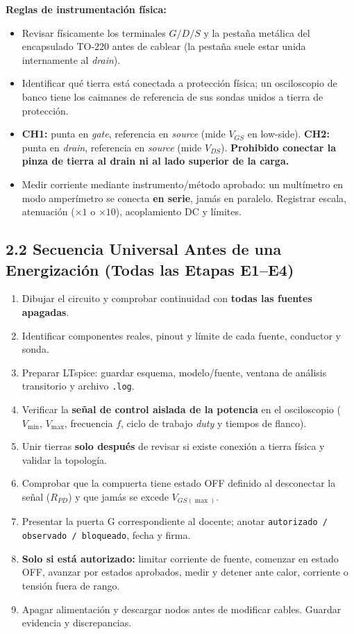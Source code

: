 \documentclass[10pt, a4paper, landscape]{article}
\begin{document}
\noindent
\textbf{Reglas de instrumentación física:}
\begin{itemize}[noitemsep, topsep=2pt]
    \item Revisar físicamente los terminales $G/D/S$ y la pestaña metálica del encapsulado TO-220 antes de cablear (la pestaña suele estar unida internamente al \textit{drain}).
    \item Identificar qué tierra está conectada a protección física; un osciloscopio de banco tiene los caimanes de referencia de sus sondas unidos a tierra de protección.
    \item \textbf{CH1:} punta en \textit{gate}, referencia en \textit{source} (mide $V_{GS}$ en low-side). \textbf{CH2:} punta en \textit{drain}, referencia en \textit{source} (mide $V_{DS}$). \textbf{\textcolor{warnred}{Prohibido conectar la pinza de tierra al drain ni al lado superior de la carga.}}
    \item Medir corriente mediante instrumento/método aprobado: un multímetro en modo amperímetro se conecta \textbf{en serie}, jamás en paralelo. Registrar escala, atenuación ($\times 1$ o $\times 10$), acoplamiento DC y límites.
\end{itemize}

\subsection*{2.2 Secuencia Universal Antes de una Energización (Todas las Etapas E1--E4)}
\begin{enumerate}[noitemsep, topsep=2pt]
    \item Dibujar el circuito y comprobar continuidad con \textbf{todas las fuentes apagadas}.
    \item Identificar componentes reales, pinout y límite de cada fuente, conductor y sonda.
    \item Preparar LTspice: guardar esquema, modelo/fuente, ventana de análisis transitorio y archivo \texttt{.log}.
    \item Verificar la \textbf{señal de control aislada de la potencia} en el osciloscopio ($V_{\min}$, $V_{\max}$, frecuencia $f$, ciclo de trabajo \textit{duty} y tiempos de flanco).
    \item Unir tierras \textbf{solo después} de revisar si existe conexión a tierra física y validar la topología.
    \item Comprobar que la compuerta tiene estado OFF definido al desconectar la señal ($R_{PD}$) y que jamás se excede $V_{GS(\max)}$.
    \item Presentar la puerta G correspondiente al docente; anotar \texttt{autorizado / observado / bloqueado}, fecha y firma.
    \item \textbf{Solo si está autorizado:} limitar corriente de fuente, comenzar en estado OFF, avanzar por estados aprobados, medir y detener ante calor, corriente o tensión fuera de rango.
    \item Apagar alimentación y descargar nodos antes de modificar cables. Guardar evidencia y discrepancias.
\end{enumerate}
\end{document}
